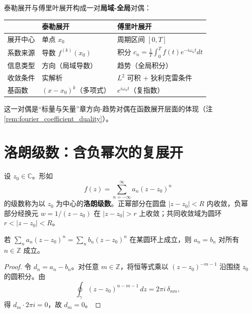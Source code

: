 \begin{remark}[泰勒展开与傅里叶展开的对偶]\label{rem:taylor_fourier_duality}
泰勒展开与傅里叶展开构成一对\textbf{局域-全局}对偶：
\begin{center}
\begin{tabular}{@{}>{\raggedright\arraybackslash}p{3.2cm}>{\raggedright\arraybackslash}p{4.2cm}>{\raggedright\arraybackslash}p{4.2cm}@{}}
\toprule
 & 泰勒展开 & 傅里叶展开 \\
\midrule
展开中心 & 单点 $x_0$ & 周期区间 $[0,T]$ \\
系数来源 & 导数 $f^{(k)}(x_0)$ & 积分 $c_n = \frac{1}{T}\int_0^T f(t) e^{-i\omega_n t} dt$ \\
信息类型 & 方向（局域导数） & 趋势（全局积分） \\
收敛条件 & 实解析 & $L^2$ 可积 + 狄利克雷条件 \\
基函数 & $(x-x_0)^k$（多项式） & $e^{i\omega_n t}$（复指数） \\
\bottomrule
\end{tabular}
\end{center}
这一对偶是“标量与矢量”章方向-趋势对偶在函数展开层面的体现（注 \ref{rem:fourier_coefficient_duality}）。
\end{remark}

\section{\texorpdfstring{洛朗级数：含负幂次的复展开}{洛朗级数}}

\begin{definition}[洛朗级数]\label{def:laurent_series}
设 $z_0 \in \mathbb{C}$。形如
\[
f(z) = \sum_{n=-\infty}^{\infty} a_n (z - z_0)^n
\]
的级数称为以 $z_0$ 为中心的\textbf{洛朗级数}。正幂部分在圆盘 $|z-z_0| < R$ 内收敛，负幂部分经换元 $w = 1/(z-z_0)$ 在 $|z-z_0| > r$ 上收敛；共同收敛域为圆环 $r < |z-z_0| < R$。
\end{definition}

\begin{lemma}[洛朗系数的唯一性]\label{lem:laurent_uniqueness}
若 $\sum_{n} a_n (z-z_0)^n = \sum_{n} b_n (z-z_0)^n$ 在某圆环上成立，则 $a_n = b_n$ 对所有 $n \in \mathbb{Z}$ 成立。
\end{lemma}

\begin{proof}
令 $d_n = a_n - b_n$。对任意 $m \in \mathbb{Z}$，将恒等式乘以 $(z-z_0)^{-m-1}$ 沿围绕 $z_0$ 的圆积分。由
\[
\oint_\gamma (z-z_0)^{n-m-1}\,dz = 2\pi i\, \delta_{nm},
\]
得 $d_m \cdot 2\pi i = 0$，故 $d_m = 0$。
\end{proof}

